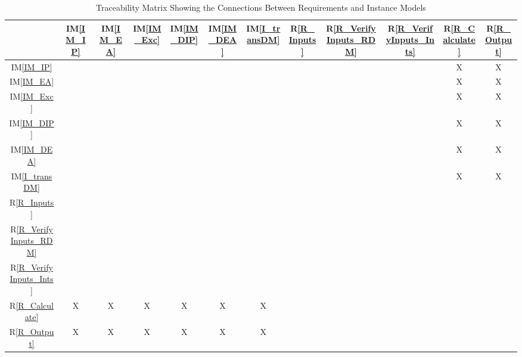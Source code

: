 \documentclass[12pt]{article}
\newcommand{\iref}[1]{IM\ref{#1}}
\newcommand{\rref}[1]{R\ref{#1}}
\begin{document}
\begin{table}[h!]
\centering
\begin{tabular}{|c|c|c|c|c|c|c|c|c|c|c|c|}
\hline
	& \iref{IM_IP}& \iref{IM_EA}& \iref{IM_Exc}& \iref{IM_DIP}& \iref{IM_DEA}& 
	\iref{I_transDM}& \rref{R_Inputs}& \rref{R_VerifyInputs_RDM}& 
	\rref{R_VerifyInputs_Ints} & \rref{R_Calculate} & \rref{R_Output}\\
\hline
\iref{IM_IP}            & & & & & & &  & & & X& X\\ \hline
\iref{IM_EA}            & & & & & & &  & & & X& X\\ \hline
\iref{IM_Exc}          & & & & & & & & & & X& X\\ \hline
\iref{IM_DIP}          & & & & & & &  & & & X& X\\ \hline
\iref{IM_DEA}          & & & & & & &  & & & X& X\\ \hline
\iref{I_transDM}          & & & & & & &  & & & X& X\\ \hline
\rref{R_Inputs}     & & & & & & & & & & &\\ \hline
\rref{R_VerifyInputs_RDM}    & & & & & & & & & & & \\ \hline
\rref{R_VerifyInputs_Ints}   & & & & & & & & & & & \\ \hline
\rref{R_Calculate}  & X& X& X& X& X& X&  & & & & \\ \hline
\rref{R_Output}     & X& X& X& X& X& X& & & & & \\ \hline  
\hline
\end{tabular}
\caption{Traceability Matrix Showing the Connections Between Requirements and Instance Models}
\label{Table:R_trace}
\end{table}


\end{document}
